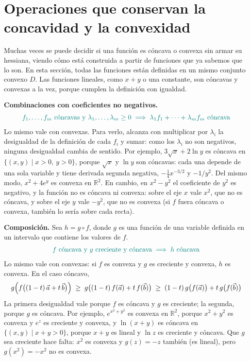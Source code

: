 \documentclass{article}
\newcommand{\R}{\ensuremath{\mathbb{R}}}
\newcommand{\vect}[1]{\vec{#1}}
\begin{document}
\section*{Operaciones que conservan la concavidad y la convexidad}

Muchas veces se puede decidir si una función es cóncava o convexa sin armar su hessiana, viendo cómo está construida a partir de funciones que ya sabemos que lo son. En esta sección, todas las funciones están definidas en un mismo conjunto convexo \(D\). Las funciones lineales, como \(x+y\) o una constante, son cóncavas y convexas a la vez, porque cumplen la definición con igualdad.

\medskip
\noindent\textbf{Combinaciones con coeficientes no negativos.}
\[
\color{teal}
f_1,\dots,f_m\ \text{cóncavas y}\ \lambda_1,\dots,\lambda_m\ge0
\;\Longrightarrow\;
\lambda_1f_1+\dots+\lambda_mf_m\ \text{cóncava}
\]
Lo mismo vale con convexas. Para verlo, alcanza con multiplicar por \(\lambda_i\) la desigualdad de la definición de cada \(f_i\) y sumar: como los \(\lambda_i\) no son negativos, ninguna desigualdad cambia de sentido. Por ejemplo, \(3\sqrt{x}+2\ln y\) es cóncava en \(\{(x,y)\mid x>0,\ y>0\}\), porque \(\sqrt{x}\) y \(\ln y\) son cóncavas: cada una depende de una sola variable y tiene derivada segunda negativa, \(-\tfrac14x^{-3/2}\) y \(-1/y^2\). Del mismo modo, \(x^2+4e^{y}\) es convexa en \(\R^2\). En cambio, en \(x^2-y^2\) el coeficiente de \(y^2\) es negativo, y la función no es cóncava ni convexa: sobre el eje \(x\) vale \(x^2\), que no es cóncava, y sobre el eje \(y\) vale \(-y^2\), que no es convexa (si \(f\) fuera cóncava o convexa, también lo sería sobre cada recta).

\medskip
\noindent\textbf{Composición.} Sea \(h=g\circ f\), donde \(g\) es una función de una variable definida en un intervalo que contiene los valores de \(f\).
\[
\color{teal}
f\ \text{cóncava y}\ g\ \text{creciente y cóncava}
\;\Longrightarrow\;
h\ \text{cóncava}
\]
Lo mismo vale con convexas: si \(f\) es convexa y \(g\) es creciente y convexa, \(h\) es convexa. En el caso cóncavo,
\[
g\Bigl(f\bigl((1-t)\,\vect{a}+t\,\vect{b}\bigr)\Bigr)
\;\ge\;
g\bigl((1-t)\,f(\vect{a})+t\,f(\vect{b})\bigr)
\;\ge\;
(1-t)\,g\bigl(f(\vect{a})\bigr)+t\,g\bigl(f(\vect{b})\bigr)
\]
La primera desigualdad vale porque \(f\) es cóncava y \(g\) es creciente; la segunda, porque \(g\) es cóncava. Por ejemplo, \(e^{x^2+y^2}\) es convexa en \(\R^2\), porque \(x^2+y^2\) es convexa y \(e^{z}\) es creciente y convexa, y \(\ln(x+y)\) es cóncava en \(\{(x,y)\mid x+y>0\}\), porque \(x+y\) es lineal y \(\ln z\) es creciente y cóncava. Que \(g\) sea creciente hace falta: \(x^2\) es convexa y \(g(z)=-z\) también (es lineal), pero \(g(x^2)=-x^2\) no es convexa.
\end{document}
